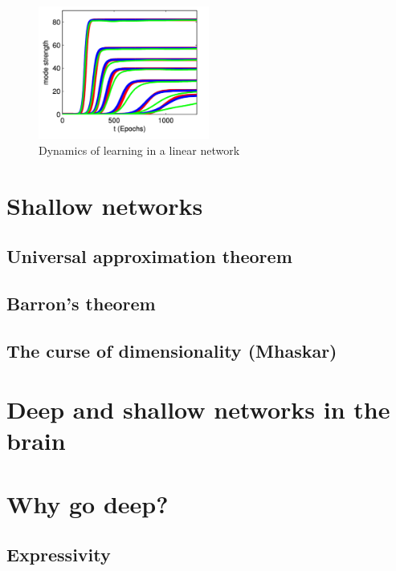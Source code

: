 \documentclass[11pt]{book} %
\begin{document}
\begin{figure}
    \centering
    \includegraphics[width=0.5\textwidth]{Figs/dynamics_linear_network.jpeg}
    \caption{Dynamics of learning in a linear network}
    \label{fig:linear_network}
\end{figure}

%
%
%

\section{Shallow networks}

\subsection{Universal approximation theorem}

%
%

\subsection{Barron's theorem}

%
%

\subsection{The curse of dimensionality (Mhaskar)}

%
%
%

\section{Deep and shallow networks in the brain}

\section{Why go deep?}
\subsection{Expressivity}
\end{document}
